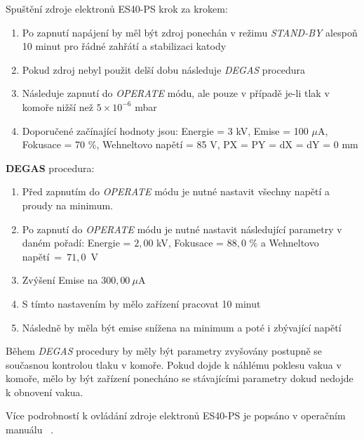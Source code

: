 Spuštění zdroje elektronů ES40-PS krok za krokem:
\begin{enumerate}
\item Po zapnutí napájení by měl být zdroj ponechán v režimu \textit{STAND-BY} alespoň 10 minut pro řádné zahřátí a stabilizaci katody
\item Pokud zdroj nebyl použit delší dobu následuje \textit{DEGAS} procedura
\item Následuje zapnutí do \textit{OPERATE} módu, ale pouze v případě je-li tlak v komoře nižší než $5 \times 10^{-6}$ mbar
\item Doporučené začínající hodnoty jsou: Energie = 3 kV, Emise = 100 $\mu$A, Fokusace = 70 \%, Wehneltovo napětí = 85 V, PX = PY = dX = dY = 0 mm
\end{enumerate} 


\textbf{DEGAS} procedura:
\begin{enumerate}
\item Před zapnutím do \textit{OPERATE} módu je nutné nastavit všechny napětí a proudy na minimum. 
\item Po zapnutí do \textit{OPERATE} módu je nutné nastavit následující parametry v daném pořadí: Energie = $2{,}00$ kV, Fokusace = $88{,}0$ \% a Wehneltovo napětí~=~$71{,}0$~V
\item Zvýšení Emise na $300{,}00 \ \mu$A 
\item S tímto nastavením by mělo zařízení pracovat 10 minut
\item Následně by měla být emise snížena na minimum a poté i zbývající napětí
\end{enumerate}
Během \textit{DEGAS} procedury by měly být parametry zvyšovány postupně se současnou kontrolou tlaku v komoře. Pokud dojde k náhlému poklesu vakua v komoře, mělo by být zařízení ponecháno se stávajícími parametry dokud nedojde k obnovení vakua.

Více podrobností k ovládání zdroje elektronů ES40-PS je popsáno v operačním manuálu ~\cite{Manual}.